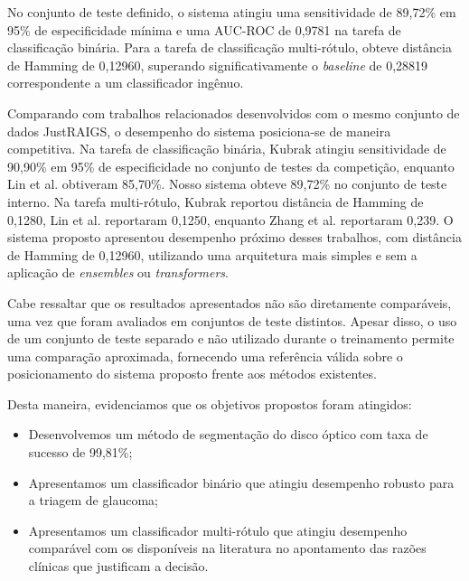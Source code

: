 \documentclass[12pt]{article}
\begin{document}
No conjunto de teste definido, o sistema atingiu uma sensitividade de 89,72\% em 95\% de especificidade mínima e uma AUC-ROC de 0,9781 na tarefa de classificação binária. Para a tarefa de classificação multi-rótulo, obteve distância de Hamming de 0,12960, superando significativamente o \emph{baseline} de 0,28819 correspondente a um classificador ingênuo.

Comparando com trabalhos relacionados desenvolvidos com o mesmo conjunto de dados JustRAIGS, o desempenho do sistema posiciona-se de maneira competitiva.  
Na tarefa de classificação binária, Kubrak \cite{justraigs_kubrak} atingiu sensitividade de 90,90\% em 95\% de especificidade no conjunto de testes da competição, enquanto Lin et al. \cite{justraigs_hu_lin} obtiveram 85,70\%. Nosso sistema obteve 89,72\% no conjunto de teste interno.
Na tarefa multi-rótulo, Kubrak reportou distância de Hamming de 0,1280, Lin et al. \cite{justraigs_hu_lin} reportaram 0,1250, enquanto Zhang et al. \cite{justraigs_zhang} reportaram 0,239. O sistema proposto apresentou desempenho próximo desses trabalhos, com distância de Hamming de 0,12960, utilizando uma arquitetura mais simples e sem a aplicação de \emph{ensembles} ou \emph{transformers}.

Cabe ressaltar que os resultados apresentados não são diretamente comparáveis, uma vez que foram avaliados em conjuntos de teste distintos. Apesar disso, o uso de um conjunto de teste separado e não utilizado durante o treinamento permite uma comparação aproximada, fornecendo uma referência válida sobre o posicionamento do sistema proposto frente aos métodos existentes.

Desta maneira, evidenciamos que os objetivos propostos foram atingidos:
\begin{itemize}[noitemsep]
    \item Desenvolvemos um método de segmentação do disco óptico com taxa de sucesso de 99,81\%;
    \item Apresentamos um classificador binário que atingiu desempenho robusto para a triagem de glaucoma;
    \item Apresentamos um classificador multi-rótulo que atingiu desempenho comparável com os disponíveis na literatura no apontamento das razões clínicas que justificam a decisão.
\end{itemize}
\end{document}
